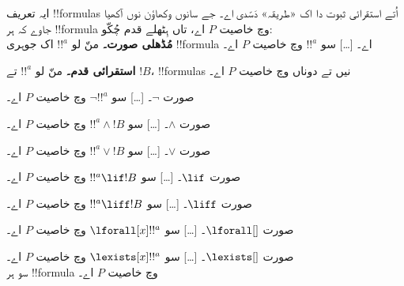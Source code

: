 \documentclass[../../include/open-logic-section]{subfiles}
\begin{document}
\begin{explain}
ایہ تعریف !!{formula}s اُتے استقرائی ثبوت دا اک «طریقہ» دَسّدی اے۔ جے سانوں وکھاؤن نوں آکھیا جاوے کہ ہر !!{formula} وچ خاصیت $P$ اے، تاں ہِٹھلے قدم چُکّو:\\

\textbf{مُڈھلی صورت۔} منّ لو $!!^a$ اک جوہری !!{formula} اے۔ [\ldots] سو $!!^a$ وچ خاصیت $P$ اے۔

\textbf{استقرائی قدم۔} منّ لو $!!^a$ تے $!B$، !!{formula}s نیں تے دوناں وچ خاصیت $P$ اے۔

صورت $\lnot$۔ [\ldots] سو $\lnot !!^a$ وچ خاصیت $P$ اے۔

صورت $\land$۔ [\ldots] سو $!!^a \land !B$ وچ خاصیت $P$ اے۔

صورت $\lor$۔ [\ldots] سو $!!^a \lor !B$ وچ خاصیت $P$ اے۔

صورت $\lif$۔ [\ldots] سو $!!^a \lif !B$ وچ خاصیت $P$ اے۔

صورت $\liff$۔ [\ldots] سو $!!^a \liff !B$ وچ خاصیت $P$ اے۔

صورت $\lforall[]$۔ [\ldots] سو $\lforall[x] !!^a$ وچ خاصیت $P$ اے۔

صورت $\lexists[]$۔ [\ldots] سو $\lexists[x] !!^a$ وچ خاصیت $P$ اے۔ \\

سو ہر !!{formula} وچ خاصیت $P$ اے۔
\end{explain}
\end{document}
